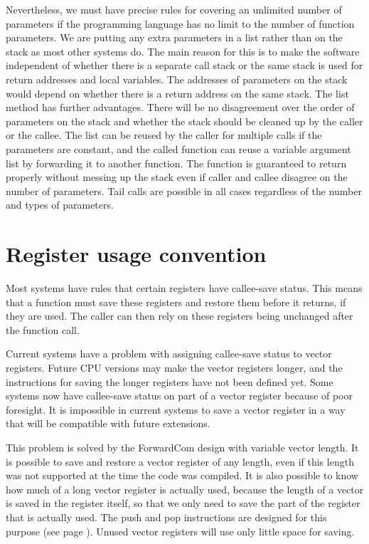 \documentclass[forwardcom.tex]{subfiles}
\begin{document}
Nevertheless, we must have precise rules for covering an unlimited number of parameters if the programming language has no limit to the number of function parameters. We are putting any extra parameters in a list rather than on the stack as most other systems do. The main reason for this is to make the software independent of whether there is a separate call stack or the same stack is used for return addresses and local variables. The addresses of parameters on the stack would depend on whether there is a return address on the same stack. The list method has further advantages. There will be no disagreement over the order of parameters on the stack and whether the stack should be cleaned up by the caller or the callee. The list can be reused by the caller for multiple calls if the parameters are constant, and the called function can reuse a variable argument list by forwarding it to another function. The function is guaranteed to return properly without messing up the stack even if caller and callee disagree on the number of parameters. Tail calls are possible in all cases regardless of the number and types of parameters. 
\vv

\section{Register usage convention} \label{chap:registerUsageConvention}
Most systems have rules that certain registers have callee-save status. This means that a function must save these registers and restore them before it returns, if they are used. The caller can then rely on these registers being unchanged after the function call.
\vv

Current systems have a problem with assigning callee-save status to vector registers. Future CPU versions may make the vector registers longer, and the instructions for saving the longer registers have not been defined yet. Some systems now have callee-save status on part of a vector register because of poor foresight. It is impossible in current systems to save a vector register in a way that will be compatible with future extensions. 
\vv

This problem is solved by the ForwardCom design with variable vector length. It is possible to save and restore a vector register of any length, even if this length was not supported at the time the code was compiled. It is also possible to know how much of a long vector register is actually used, because the length of a vector is saved in the register itself, so that we only need to save the part of the register that is actually used. The push and pop instructions are designed for this purpose (see page \pageref{table:pushInstruction}). Unused vector registers will use only little space for saving. 
\vv
\end{document}
